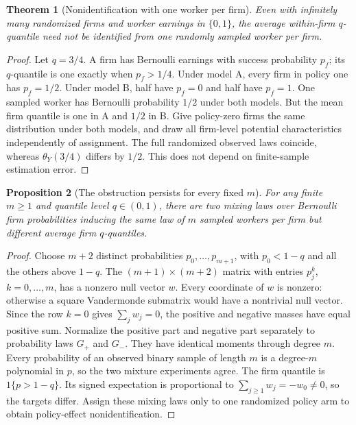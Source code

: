 \documentclass[11pt]{article}
\newtheorem{theorem}{Theorem}
\newtheorem{proposition}[theorem]{Proposition}
\theoremstyle{remark}
\begin{document}
\begin{theorem}[Nonidentification with one worker per firm]
Even with infinitely many randomized firms and worker earnings in $\{0,1\}$, the average within-firm $q$-quantile need not be identified from one randomly sampled worker per firm.
\end{theorem}
\begin{proof}
Let $q=3/4$. A firm has Bernoulli earnings with success probability $p_f$; its $q$-quantile is one exactly when $p_f>1/4$. Under model A, every firm in policy one has $p_f=1/2$. Under model B, half have $p_f=0$ and half have $p_f=1$. One sampled worker has Bernoulli probability $1/2$ under both models. But the mean firm quantile is one in A and $1/2$ in B. Give policy-zero firms the same distribution under both models, and draw all firm-level potential characteristics independently of assignment. The full randomized observed laws coincide, whereas $\theta_Y(3/4)$ differs by $1/2$. This does not depend on finite-sample estimation error.
\end{proof}

\begin{proposition}[The obstruction persists for every fixed $m$]
For any finite $m\ge1$ and quantile level $q\in(0,1)$, there are two mixing laws over Bernoulli firm probabilities inducing the same law of $m$ sampled workers per firm but different average firm $q$-quantiles.
\end{proposition}
\begin{proof}
Choose $m+2$ distinct probabilities $p_0,\ldots,p_{m+1}$, with $p_0<1-q$ and all the others above $1-q$. The $(m+1)\times(m+2)$ matrix with entries $p_j^k$, $k=0,\ldots,m$, has a nonzero null vector $w$. Every coordinate of $w$ is nonzero: otherwise a square Vandermonde submatrix would have a nontrivial null vector. Since the row $k=0$ gives $\sum_jw_j=0$, the positive and negative masses have equal positive sum. Normalize the positive part and negative part separately to probability laws $G_+$ and $G_-$. They have identical moments through degree $m$.
Every probability of an observed binary sample of length $m$ is a degree-$m$ polynomial in $p$, so the two mixture experiments agree. The firm quantile is $1\{p>1-q\}$. Its signed expectation is proportional to $\sum_{j\ge1}w_j=-w_0\ne0$, so the targets differ. Assign these mixing laws only to one randomized policy arm to obtain policy-effect nonidentification.
\end{proof}
\end{document}
